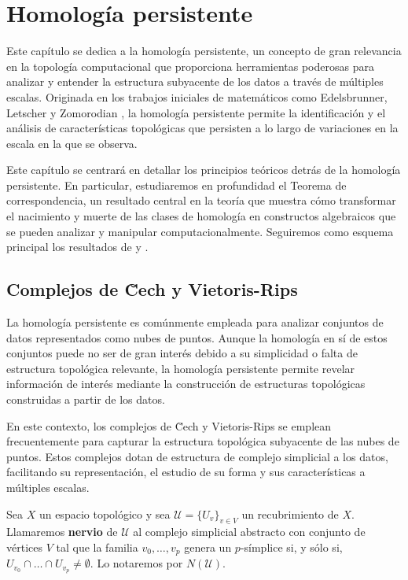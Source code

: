 
\chapter{Homología persistente}

Este capítulo se dedica a la homología persistente, un concepto de gran relevancia en la topología computacional que proporciona herramientas poderosas para analizar y entender la estructura subyacente de los datos a través de múltiples escalas. Originada en los trabajos iniciales de matemáticos como Edelsbrunner, Letscher y Zomorodian \cite{edelsbrunner2002topological}, la homología persistente permite la identificación y el análisis de características topológicas que persisten a lo largo de variaciones en la escala en la que se observa.

Este capítulo se centrará en detallar los principios teóricos detrás de la homología persistente. En particular, estudiaremos en profundidad el Teorema de correspondencia, un resultado central en la teoría que muestra cómo transformar el nacimiento y muerte de las clases de homología en constructos algebraicos que se pueden analizar y manipular computacionalmente. Seguiremos como esquema principal los resultados de \cite{zomorodian2004computing} y \cite{dey2022computational}.

\section{Complejos de \u Cech y Vietoris-Rips}

La homología persistente es comúnmente empleada para analizar conjuntos de datos representados como nubes de puntos. Aunque la homología en sí de estos conjuntos puede no ser de gran interés debido a su simplicidad o falta de estructura topológica relevante, la homología persistente permite revelar información de interés mediante la construcción de estructuras topológicas construidas a partir de los datos.

En este contexto, los complejos de \u Cech y Vietoris-Rips se emplean frecuentemente para capturar la estructura topológica subyacente de las nubes de puntos. Estos complejos dotan de estructura de complejo simplicial a los datos, facilitando su representación, el estudio de su forma y sus características a múltiples escalas.

\begin{definicion}
	Sea \(X\) un espacio topológico y sea \(\mathcal{U} = \{U_v\}_{v \in V}\) un recubrimiento de \(X\). Llamaremos \textbf{nervio} de \(\mathcal{U}\) al complejo simplicial abstracto con conjunto de vértices \(V\) tal que la familia \(v_0, \dots, v_p\) genera un \(p\)-símplice si, y sólo si, \(U_{v_0} \cap \dots \cap U_{v_p} \neq \emptyset\). Lo notaremos por \(N(\mathcal{U})\).
\end{definicion}

